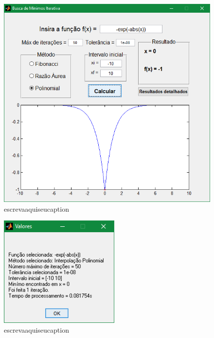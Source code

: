 \begin{figure}[H]
	\begin{center}	
		\includegraphics[width=14cm]{../interpol/f4_1_gui.PNG}
		\caption{escrevaaquiseucaption}
		\label{fig:f4_1_gui}
	\end{center}
\end{figure}

\begin{figure}[H]
	\begin{center}	
		\includegraphics[width=6cm]{../interpol/f4_1_resultados.PNG}
		\caption{escrevaaquiseucaption}
		\label{fig:f4_1_resultados}
	\end{center}
\end{figure}

